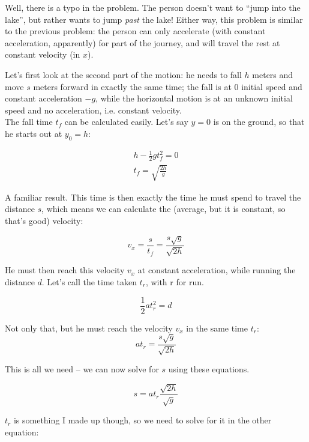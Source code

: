 \documentclass[8.01x]{subfiles}
\begin{document}
Well, there is a typo in the problem. The person doesn't want to ``jump into the lake'', but rather wants to jump \emph{past} the lake! Either way, this problem is similar to the previous problem: the person can only accelerate (with constant acceleration, apparently) for part of the journey, and will travel the rest at constant velocity (in $x$).

Let's first look at the second part of the motion: he needs to fall $h$ meters and move $s$ meters forward in exactly the same time; the fall is at 0 initial speed and constant acceleration $-g$, while the horizontal motion is at an unknown initial speed and no acceleration, i.e. constant velocity.\\
The fall time $t_f$ can be calculated easily. Let's say $y = 0$ is on the ground, so that he starts out at $y_0 = h$:

\begin{align}
h - \frac{1}{2} g t_f^2 = 0\\
t_f = \sqrt{\frac{2 h}{g}}
\end{align}

A familiar result. This time is then exactly the time he must spend to travel the distance $s$, which means we can calculate the (average, but it is constant, so that's good) velocity:

\begin{equation}
v_x = \frac{s}{t_f} = \frac{s \sqrt{g}}{\sqrt{2h}}
\end{equation}

He must then reach this velocity $v_x$ at constant acceleration, while running the distance $d$. Let's call the time taken $t_r$, with r for run.

\begin{equation}
\frac{1}{2}a t_r^2 = d
\end{equation}

Not only that, but he must reach the velocity $v_x$ in the same time $t_r$:
\begin{equation}
a t_r = \frac{s \sqrt{g}}{\sqrt{2h}}
\end{equation}

This is all we need -- we can now solve for $s$ using these equations.

\begin{equation}
s = a t_r \frac{\sqrt{2h}}{\sqrt{g}}
\end{equation}

$t_r$ is something I made up though, so we need to solve for it in the other equation:
\end{document}
